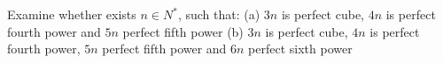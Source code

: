 Examine whether exists $n \in N^*$, such that:
(a) $3n$ is perfect cube, $4n$ is perfect fourth power and $5n$ perfect fifth power
(b) $3n$ is  perfect cube, $4n$ is perfect fourth power, $5n$ perfect fifth power and $6n$ perfect sixth power